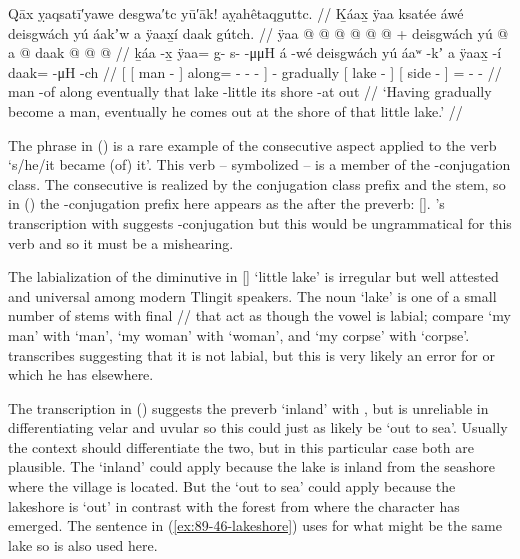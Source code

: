 \ex\label{ex:89-121-became-man-came-lakeshore}%
%
\begingl
	\glpreamble	Qāx ỵaqsatī′yawe desgwa′tc yū′āk! aỵahêtaqguttc. //
	\glpreamble	Ḵáax̱ ÿaa ksatée áwé deisgwách yú áakʼw a ÿaax̱í daak gútch. //
	\gla	{} {}  {} {} ÿaa @  @ {} @ {} @ {} @ {} {}
		 @ {} +
		deisgwách
		{} yú  @ {} {}
		{} a  @ {} {}
		daak @  @ {} @ {} //
	\glb	{} {} ḵáa -x̱ {} ÿaa= g- s-  -μμH {} {}
		á -wé
		deisgwách
		{} yú áaʷ -kʼ {}
		{} a ÿaax̱ -í {}
		daak=  -μH -ch //
	\glc	{}[ {}[ man - {}] along= - -  - \· {}]
		 -
		gradually
		{}[  lake - {}]
		{}[  side - {}]
		=  - - //
	\gld	{} {} man -of {} along\•  {} {} {} {} {}
		 {}
		eventually
		{} that lake -little {}
		{} its shore -at {}
		out\•  {} {} //
	\glft	‘Having gradually become a man, eventually he comes out at the shore of that little lake.’
		//
\endgl
\xe

The phrase  in (\lastx) is a rare example of the consecutive aspect applied to the verb  ‘s/he/it became (of) it’.
This verb – symbolized  – is a member of the -conjugation class.
The consecutive is realized by the conjugation class prefix and the  stem, so in (\lastx) the -conjugation prefix here appears as the  after the  preverb:  [].
\citeauthor{swanton:1909}’s transcription with  suggests -conjugation but this would be ungrammatical for this verb and so it must be a mishearing.

The labialization of the diminutive  in  [] ‘little lake’ is irregular but well attested and universal among modern Tlingit speakers.
The noun  ‘lake’ is one of a small number of stems with final // that act as though the vowel is labial; compare  ‘my man’ with  ‘man’,  ‘my woman’ with  ‘woman’, and  ‘my corpse’ with  ‘corpse’.
\citeauthor{swanton:1909} transcribes  suggesting that it is not labial, but this is very likely an error for  or  which he has elsewhere.

The transcription  in (\lastx) suggests the preverb  ‘inland’ with , but \citeauthor{swanton:1909} is unreliable in differentiating velar and uvular so this could just as likely be  ‘out to sea’.
Usually the context should differentiate the two, but in this particular case both are plausible.
The  ‘inland’ could apply because the lake is inland from the seashore where the village is located.
But the  ‘out to sea’ could apply because the lakeshore is ‘out’ in contrast with the forest from where the character has emerged.
The sentence in (\ref{ex:89-46-lakeshore}) uses  for what might be the same lake so  is also used here.


